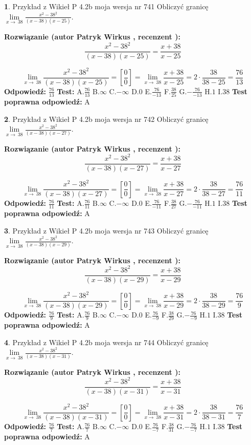\documentclass[12pt, a4paper]{article}
\theoremstyle{definition} %
\newtheorem{zad}{}
\newcommand{\zadStart}[1]{\begin{zad}#1\newline}
\newcommand{\zadStop}{\end{zad}}
\newcommand{\rozwStart}[2]{\noindent \textbf{Rozwiązanie (autor #1 , recenzent #2): }\newline}
\newcommand{\rozwStop}{\newline}
\newcommand{\odpStart}{\noindent \textbf{Odpowiedź:}\newline}
\newcommand{\odpStop}{\newline}
\newcommand{\testStart}{\noindent \textbf{Test:}\newline}
\newcommand{\testStop}{\newline}
\newcommand{\kluczStart}{\noindent \textbf{Test poprawna odpowiedź:}\newline}
\newcommand{\kluczStop}{\newline}
\begin{document}
\zadStart{Przykład z Wikieł P 4.2b moja wersja nr 741}
Obliczyć granicę $\lim\limits_{x\to\ 38}\frac{x^{2}-38^{2}}{(x-38)(x-25)}$.
\zadStop
\rozwStart{Patryk Wirkus}{}
$$\frac{x^{2}-38^{2}}{(x-38)(x-25)}=\frac{x+38}{x-25}$$

$$\lim\limits_{x\to\ 38}\frac{x^{2}-38^{2}}{(x-38)(x-25)}=[\frac{0}{0}]=\lim\limits_{x\to\ 38}\frac{x+38}{x-25}=2 \cdot \frac{38}{38-25} = \frac{76}{13}$$
\rozwStop
\odpStart
$\frac{76}{13}$
\odpStop
\testStart
A.$\frac{76}{13}$
B.$\infty$
C.$-\infty$
D.$0$
E.$\frac{76}{-13}$
F.$\frac{38}{25}$
G.$-\frac{76}{-13}$
H.$1$
I.$38$
\testStop
\kluczStart
A
\kluczStop



\zadStart{Przykład z Wikieł P 4.2b moja wersja nr 742}
Obliczyć granicę $\lim\limits_{x\to\ 38}\frac{x^{2}-38^{2}}{(x-38)(x-27)}$.
\zadStop
\rozwStart{Patryk Wirkus}{}
$$\frac{x^{2}-38^{2}}{(x-38)(x-27)}=\frac{x+38}{x-27}$$

$$\lim\limits_{x\to\ 38}\frac{x^{2}-38^{2}}{(x-38)(x-27)}=[\frac{0}{0}]=\lim\limits_{x\to\ 38}\frac{x+38}{x-27}=2 \cdot \frac{38}{38-27} = \frac{76}{11}$$
\rozwStop
\odpStart
$\frac{76}{11}$
\odpStop
\testStart
A.$\frac{76}{11}$
B.$\infty$
C.$-\infty$
D.$0$
E.$\frac{76}{-11}$
F.$\frac{38}{27}$
G.$-\frac{76}{-11}$
H.$1$
I.$38$
\testStop
\kluczStart
A
\kluczStop



\zadStart{Przykład z Wikieł P 4.2b moja wersja nr 743}
Obliczyć granicę $\lim\limits_{x\to\ 38}\frac{x^{2}-38^{2}}{(x-38)(x-29)}$.
\zadStop
\rozwStart{Patryk Wirkus}{}
$$\frac{x^{2}-38^{2}}{(x-38)(x-29)}=\frac{x+38}{x-29}$$

$$\lim\limits_{x\to\ 38}\frac{x^{2}-38^{2}}{(x-38)(x-29)}=[\frac{0}{0}]=\lim\limits_{x\to\ 38}\frac{x+38}{x-29}=2 \cdot \frac{38}{38-29} = \frac{76}{9}$$
\rozwStop
\odpStart
$\frac{76}{9}$
\odpStop
\testStart
A.$\frac{76}{9}$
B.$\infty$
C.$-\infty$
D.$0$
E.$\frac{76}{-9}$
F.$\frac{38}{29}$
G.$-\frac{76}{-9}$
H.$1$
I.$38$
\testStop
\kluczStart
A
\kluczStop



\zadStart{Przykład z Wikieł P 4.2b moja wersja nr 744}
Obliczyć granicę $\lim\limits_{x\to\ 38}\frac{x^{2}-38^{2}}{(x-38)(x-31)}$.
\zadStop
\rozwStart{Patryk Wirkus}{}
$$\frac{x^{2}-38^{2}}{(x-38)(x-31)}=\frac{x+38}{x-31}$$

$$\lim\limits_{x\to\ 38}\frac{x^{2}-38^{2}}{(x-38)(x-31)}=[\frac{0}{0}]=\lim\limits_{x\to\ 38}\frac{x+38}{x-31}=2 \cdot \frac{38}{38-31} = \frac{76}{7}$$
\rozwStop
\odpStart
$\frac{76}{7}$
\odpStop
\testStart
A.$\frac{76}{7}$
B.$\infty$
C.$-\infty$
D.$0$
E.$\frac{76}{-7}$
F.$\frac{38}{31}$
G.$-\frac{76}{-7}$
H.$1$
I.$38$
\testStop
\kluczStart
A
\kluczStop
\end{document}
